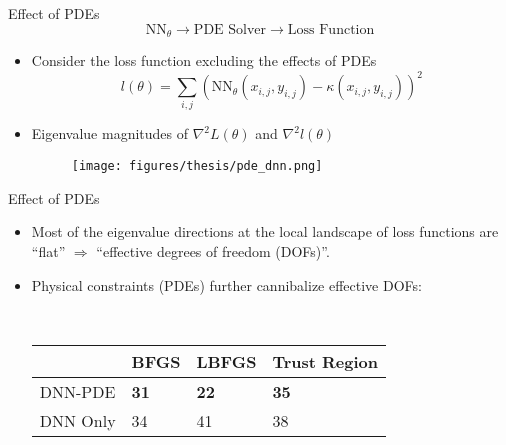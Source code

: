 \documentclass[usenames,dvipsnames]{beamer}
\begin{document}
\begin{frame}{Effect of PDEs}
	$$\text{NN}_\theta \rightarrow \text{PDE Solver}  \rightarrow \text{Loss Function}$$
	\vspace{-0.5cm}
	\begin{itemize}
\item Consider the loss function excluding the effects of PDEs 
$$    l(\theta) = \sum_{i,j} (\text{NN}_\theta(x_{i,j}, y_{i,j}) - \kappa(x_{i,j}, y_{i,j}))^2 $$

\item Eigenvalue magnitudes of $\nabla^2 L(\theta)$ and $\nabla^2 l(\theta)$
	\begin{figure}[htbp]
	\centering
	\texttt{[image: figures/thesis/pde\_dnn.png]}
\end{figure}
	\end{itemize}
\end{frame}

\begin{frame}{Effect of PDEs}
\begin{itemize}
\item Most of the eigenvalue directions at the local landscape of loss functions are ``flat'' $\Rightarrow$ ``effective degrees of freedom (DOFs)''. 

\item Physical constraints (PDEs) further cannibalize effective DOFs:

\

\begin{center}
		\begin{tabular}{@{}llll@{}}
		\toprule
		& BFGS & LBFGS & Trust Region \\ \midrule
		DNN-PDE     & \textbf{31}   & \textbf{22}    & \textbf{35}           \\
		DNN Only &  34   & 41    & 38           \\ \bottomrule
	\end{tabular}
\end{center}


\end{itemize}
\end{frame}
\end{document}
